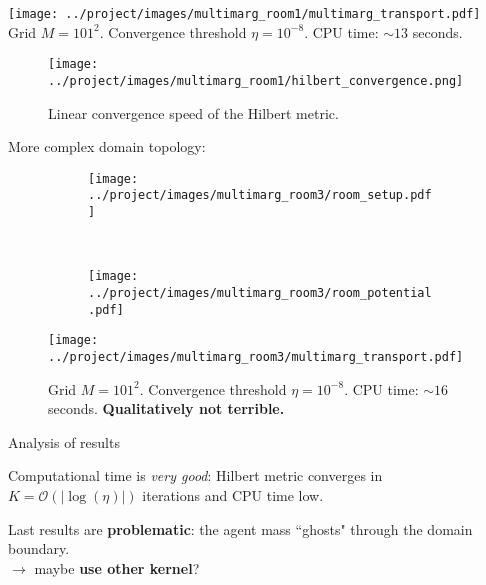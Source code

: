\documentclass[xcolor={dvipsnames}]{beamer}
\newcommand{\calO}{\mathcal{O}}
\newcommand{\redfont}{\color{darkred}}
\newcommand{\greenfont}{\color{Green!90!black}}
\begin{document}
\begin{frame}
	
	\texttt{[image: ../project/images/multimarg\_room1/multimarg\_transport.pdf]}
	Grid $M=101^2$. Convergence threshold $\eta = 10^{-8}$. CPU time: $\sim 13$ seconds.
\end{frame}

\begin{frame}
	\begin{figure}
		\centering
		\texttt{[image: ../project/images/multimarg\_room1/hilbert\_convergence.png]}
		\caption{Linear convergence speed of the Hilbert metric.}
	\end{figure}
	
\end{frame}

\begin{frame}
	
	More complex domain topology:
	
	\begin{figure}
		\begin{subfigure}{.45\linewidth}
			\texttt{[image: ../project/images/multimarg\_room3/room\_setup.pdf]}
		\end{subfigure}~
		\begin{subfigure}{.49\linewidth}
			\texttt{[image: ../project/images/multimarg\_room3/room\_potential.pdf]}
		\end{subfigure}
	\end{figure}
	
\end{frame}


\begin{frame}
	\begin{figure}
	\texttt{[image: ../project/images/multimarg\_room3/multimarg\_transport.pdf]}
	\caption{Grid $M=101^2$. Convergence threshold $\eta = 10^{-8}$. CPU time: $\sim 16$ seconds.
	{\bfseries\redfont Qualitatively not terrible.}}	
	\end{figure}
\end{frame}


\begin{frame}{Analysis of results}
	
	Computational time is \textit{\greenfont very good}: Hilbert metric converges in $K = \calO(|{\log(\eta)}|)$ iterations and CPU time low.
	
	Last results are \textbf{problematic}: the agent mass ``ghosts" through the domain boundary.\\
	$\rightarrow$ maybe \textbf{use other kernel}?
	
\end{frame}
\end{document}
